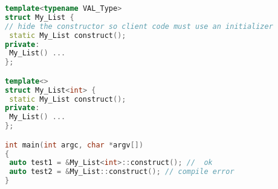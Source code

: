 \begin{lstlisting}[caption={%
\emblink{\#lst--multi--\thelstlisting.pgvm-pdf}{Addressable vs. Multi-Addressable Initializers}},
  language = C++, numbers = none, escapechar = !,label={lst:multi},
    basicstyle = \ttfamily\bfseries\footnotesize, linewidth = \linewidth]
template<typename VAL_Type>
struct My_List {
// hide the constructor so client code must use an initializer
 static My_List construct();
private:
 My_List() ... 
};

template<>
struct My_List<int> {
 static My_List construct();
private:
 My_List() ... 
};

int main(int argc, char *argv[])
{
 auto test1 = &My_List<int>::construct(); //  ok
 auto test2 = &My_List::construct(); // compile error
}
\end{lstlisting}

\vspace{-1em}
